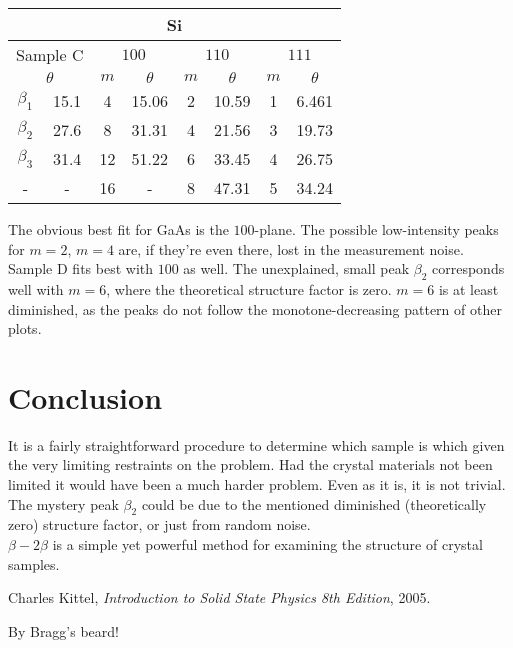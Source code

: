 \documentclass[a4paper,twoside=false,abstract=false,numbers=noenddot,
titlepage=false,headings=small,parskip=half,version=last]{scrartcl}
\begin{document}
\begin{tabular}{ |c|c|c|c|c|c|c|c| }
	\hline
    \multicolumn{8}{|c|}{Si}\\
    \hline
    \multicolumn{2}{|c|}{Sample C}
	& \multicolumn{2}{|c|}{$100$}
	& \multicolumn{2}{|c|}{$110$}
	& \multicolumn{2}{|c|}{$111$}\\
    \hline
	\multicolumn{2}{|c|}{$\theta$}& $m$ & $\theta$ & $m$ & $\theta$ & $m$ & $\theta$ \\
	\hline
    $\beta_1$	& 15.1\degree	& 4		& 15.06\degree	& 2	& 10.59\degree	& 1	& 6.461\degree	\\
    $\beta_2$	& 27.6\degree	& 8		& 31.31\degree	& 4	& 21.56\degree	& 3	& 19.73\degree	\\
    $\beta_3$	& 31.4\degree	& 12	& 51.22\degree	& 6	& 33.45\degree	& 4	& 26.75\degree	\\
    -			& -				& 16	& -				& 8	& 47.31\degree	& 5	& 34.24\degree	\\
	\hline
\end{tabular}

The obvious best fit for GaAs is the $100$-plane.
The possible low-intensity peaks for $m=2$, $m=4$ are, if they're even there, lost in the measurement noise.\\
Sample D fits best with $100$ as well.
The unexplained, small peak $\beta_2$ corresponds well with $m=6$,
where the theoretical structure factor is zero.
$m=6$ is at least diminished,
as the peaks do not follow the monotone-decreasing pattern of other plots.

\section{Conclusion}
It is a fairly straightforward procedure to determine which sample is which given the very limiting restraints on the problem.
Had the crystal materials not been limited it would have been a much harder problem. Even as it is, it is not trivial.
The mystery peak $\beta_2$ could be due to the mentioned diminished (theoretically zero) structure factor, or just from random noise.\\
$\beta-2\beta$ is a simple yet powerful method for examining the structure of crystal samples.

\begin{thebibliography}{1}
        Charles Kittel,
        {\em Introduction to Solid State Physics 8th Edition},
        2005.
\end{thebibliography}


\textcolor{braggred}{By Bragg's beard!}
\end{document}
